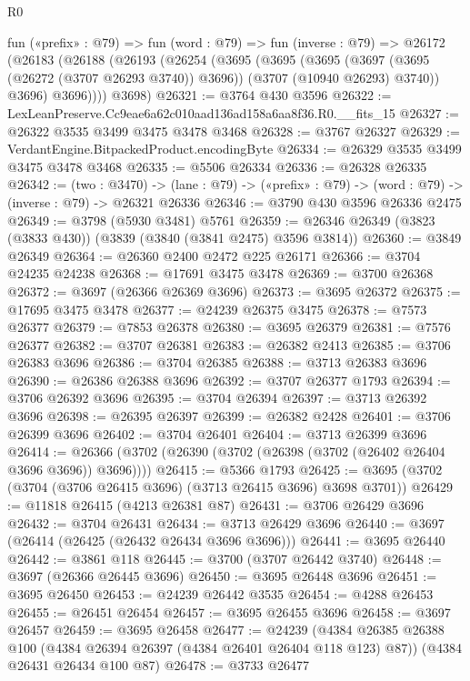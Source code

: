 \begin{lexlean}{R0}
\begin{coremodule}
  fun («prefix» : @79) =>
  fun (word : @79) =>
  fun (inverse : @79) =>
  @26172
    (@26183
      (@26188
        (@26193
          (@26254
            (@3695
              (@3695
                (@3695
                  (@3697 (@3695 (@26272 (@3707 @26293 @3740)) @3696))
                  (@3707 (@10940 @26293) @3740))
                @3696)
              @3696))))
      @3698)
@26321 := @3764 @430 @3596
@26322 := LexLeanPreserve.Cc9eae6a62c010aad136ad158a6aa8f36.R0.__fits_15
@26327 := @26322 @3535 @3499 @3475 @3478 @3468
@26328 := @3767 @26327
@26329 := VerdantEngine.BitpackedProduct.encodingByte
@26334 := @26329 @3535 @3499 @3475 @3478 @3468
@26335 := @5506 @26334
@26336 := @26328 @26335
@26342 := (two : @3470) ->
  (lane : @79) -> («prefix» : @79) -> (word : @79) -> (inverse : @79) -> @26321 @26336
@26346 := @3790 @430 @3596 @26336 @2475
@26349 := @3798 (@5930 @3481) @5761
@26359 := @26346 @26349 (@3823 (@3833 @430)) (@3839 (@3840 (@3841 @2475) @3596 @3814))
@26360 := @3849 @26349
@26364 := @26360 @2400 @2472 @225 @26171
@26366 := @3704 @24235 @24238
@26368 := @17691 @3475 @3478
@26369 := @3700 @26368
@26372 := @3697 (@26366 @26369 @3696)
@26373 := @3695 @26372
@26375 := @17695 @3475 @3478
@26377 := @24239 @26375 @3475
@26378 := @7573 @26377
@26379 := @7853 @26378
@26380 := @3695 @26379
@26381 := @7576 @26377
@26382 := @3707 @26381
@26383 := @26382 @2413
@26385 := @3706 @26383 @3696
@26386 := @3704 @26385
@26388 := @3713 @26383 @3696
@26390 := @26386 @26388 @3696
@26392 := @3707 @26377 @1793
@26394 := @3706 @26392 @3696
@26395 := @3704 @26394
@26397 := @3713 @26392 @3696
@26398 := @26395 @26397
@26399 := @26382 @2428
@26401 := @3706 @26399 @3696
@26402 := @3704 @26401
@26404 := @3713 @26399 @3696
@26414 := @26366 (@3702 (@26390 (@3702 (@26398 (@3702 (@26402 @26404 @3696 @3696)) @3696))))
@26415 := @5366 @1793
@26425 := @3695 (@3702 (@3704 (@3706 @26415 @3696) (@3713 @26415 @3696) @3698 @3701))
@26429 := @11818 @26415 (@4213 @26381 @87)
@26431 := @3706 @26429 @3696
@26432 := @3704 @26431
@26434 := @3713 @26429 @3696
@26440 := @3697 (@26414 (@26425 (@26432 @26434 @3696 @3696)))
@26441 := @3695 @26440
@26442 := @3861 @118
@26445 := @3700 (@3707 @26442 @3740)
@26448 := @3697 (@26366 @26445 @3696)
@26450 := @3695 @26448 @3696
@26451 := @3695 @26450
@26453 := @24239 @26442 @3535
@26454 := @4288 @26453
@26455 := @26451 @26454
@26457 := @3695 @26455 @3696
@26458 := @3697 @26457
@26459 := @3695 @26458
@26477 := @24239
    (@4384 @26385 @26388 @100 (@4384 @26394 @26397 (@4384 @26401 @26404 @118 @123) @87))
    (@4384 @26431 @26434 @100 @87)
@26478 := @3733 @26477

\end{coremodule}
\end{lexlean}
